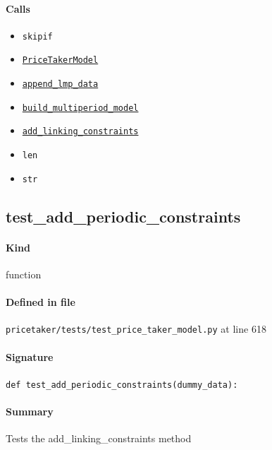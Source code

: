 \documentclass[11pt]{report}
\begin{document}
\paragraph{Calls}
\begin{itemize}[leftmargin=*]
  \item \texttt{skipif}
  \item \hyperref[def:pricetaker-price_taker_model.py:PriceTakerModel:L161]{\texttt{PriceTakerModel}}
  \item \hyperref[def:pricetaker-price_taker_model.py:PriceTakerModel.append_lmp_data:L221]{\texttt{append\_lmp\_data}}
  \item \hyperref[def:pricetaker-price_taker_model.py:PriceTakerModel.build_multiperiod_model:L291]{\texttt{build\_multiperiod\_model}}
  \item \hyperref[def:pricetaker-price_taker_model.py:PriceTakerModel.add_linking_constraints:L564]{\texttt{add\_linking\_constraints}}
  \item \texttt{len}
  \item \texttt{str}
\end{itemize}
\subsection{test\_add\_periodic\_constraints}
\label{def:pricetaker-tests-test_price_taker_model.py:test_add_periodic_constraints:L618}
\paragraph{Kind} function
\paragraph{Defined in file} \texttt{pricetaker/tests/test\_price\_taker\_model.py} at line 618
\paragraph{Signature} \texttt{def test\_add\_periodic\_constraints(dummy\_data):}
\paragraph{Summary} Tests the add\_linking\_constraints method
\end{document}

